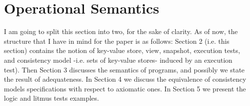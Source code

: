 \section{Operational Semantics}
\label{sec:model}
\label{sec:semantics}

\ac{I am going to split this section into two, for the sake of clarity. 
As of now, the structure that I have in mind for the paper is as follows: 
Section 2 (i.e. this section) contains the notion of key-value store, view, snapshot, 
execution tests, and consistency model  -i.e. sets of key-value stores- 
induced by an execution test). Then Section 3 discusses 
the semantics of programs, and possibly we state the result 
of adequateness. In Section 4 we discuss the equivalence of consistency 
models specifications with respect to axiomatic ones. In Section 5 
we present the logic and litmus tests examples.}





%
